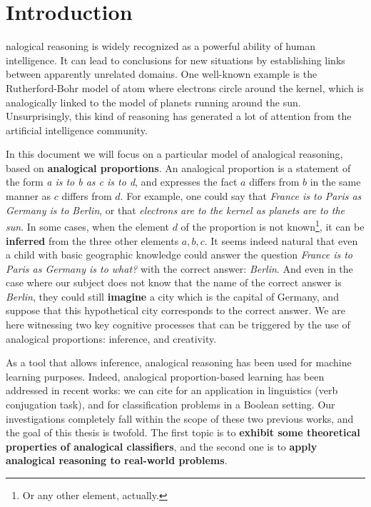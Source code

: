 \chapter*{Introduction}
nalogical reasoning is widely recognized as a powerful ability of
human intelligence.  It can lead to conclusions for new situations by
establishing links between apparently unrelated domains. One well-known example
is the Rutherford-Bohr model of atom where electrons circle around the kernel,
which is analogically linked to the model of planets running around the sun.
Unsurprisingly, this kind of reasoning has generated a lot of attention from
the artificial intelligence community.

In this document we will focus on a particular model of analogical reasoning,
based on \textbf{analogical proportions}. An analogical proportion is a
statement of the form \textit{a is to b as c is to d}, and expresses the fact
$a$ differs from $b$ in the same manner as $c$ differs from $d$. For example,
one could say that \textit{France is to Paris as Germany is to Berlin}, or that
\textit{electrons are to the kernel as planets are to the sun}. In some cases,
when the element $d$ of the proportion is not known\footnote{Or any other
element, actually.}, it can be \textbf{inferred} from the three other elements
$a, b, c$. It seems indeed natural that even a child with basic geographic
knowledge could answer the question \textit{France is to Paris as Germany is to
what?} with the correct answer: \textit{Berlin}. And even in the case where our
subject does not know that the name of the correct answer is \textit{Berlin},
they could still \textbf{imagine} a city  which is the capital of Germany, and
suppose that this hypothetical city corresponds to the correct answer. We are
here witnessing two key cognitive processes that can be triggered by the use
of analogical proportions: inference, and creativity.

As a tool that allows inference, analogical reasoning has been used for machine
learning purposes. Indeed, analogical proportion-based learning has been
addressed in recent works: we can cite \cite{StrYvoCNLL05} for an application
in linguistics (verb conjugation task), and \cite{BayMicDelIJCAI07} for
classification problems in a Boolean setting. Our investigations completely
fall within the scope of these two previous works, and the goal of this thesis
is twofold. The first topic is to \textbf{exhibit some theoretical properties
of analogical classifiers}, and the second one is to \textbf{apply analogical
reasoning to real-world problems}.


